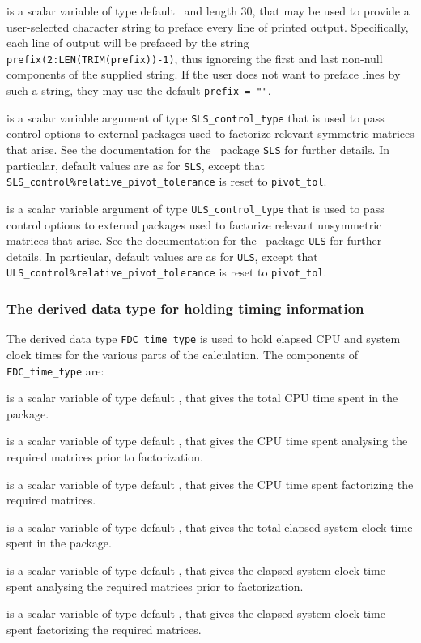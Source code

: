 \documentclass{galahad}
\newcommand{\packagename}{FDC}
\begin{document}
\begin{description}
 is a scalar variable of type default \character\
and length 30, that may be used to provide a user-selected
character string to preface every line of printed output.
Specifically, each line of output will be prefaced by the string
{\tt prefix(2:LEN(TRIM(prefix))-1)},
thus ignoreing the first and last non-null components of the
supplied string. If the user does not want to preface lines by such
a string, they may use the default {\tt prefix = ""}.

 is a scalar variable argument of type
{\tt SLS\_control\_type} that is used to pass control
options to external packages used to
factorize relevant symmetric matrices that arise.
See the documentation for the \galahad\ package {\tt SLS} for further details.
In particular, default values are as for {\tt SLS}, except that
{\tt SLS\_control\%rela\-tive\_pivot\_tolerance} is reset to
{\tt pivot\_tol}.

 is a scalar variable argument of type
{\tt ULS\_control\_type} that is used to pass control
options to external packages used to
factorize relevant unsymmetric matrices that arise.
See the documentation for the \galahad\ package {\tt ULS} for further details.
In particular, default values are as for {\tt ULS}, except that
{\tt ULS\_control\%rela\-tive\_pivot\_tolerance} is reset to
{\tt pivot\_tol}.

\end{description}


\subsubsection{The derived data type for holding timing
 information}\label{typetime}
The derived data type
{\tt \packagename\_time\_type}
is used to hold elapsed CPU and system clock times for the various parts of
the calculation. The components of
{\tt \packagename\_time\_type}
are:
\begin{description}
 is a scalar variable of type default \realdp, that gives
 the total CPU time spent in the package.

 is a scalar variable of type default \realdp, that gives
 the CPU time spent analysing the required matrices prior to factorization.

 is a scalar variable of type default \realdp, that gives
 the CPU time spent factorizing the required matrices.

 is a scalar variable of type default \realdp, that gives
 the total elapsed system clock time spent in the package.

 is a scalar variable of type default \realdp, that gives
 the elapsed system clock time spent analysing the required matrices prior to
factorization.

 is a scalar variable of type default \realdp, that gives
 the elapsed system clock time spent factorizing the required matrices.

\end{description}
\end{document}
